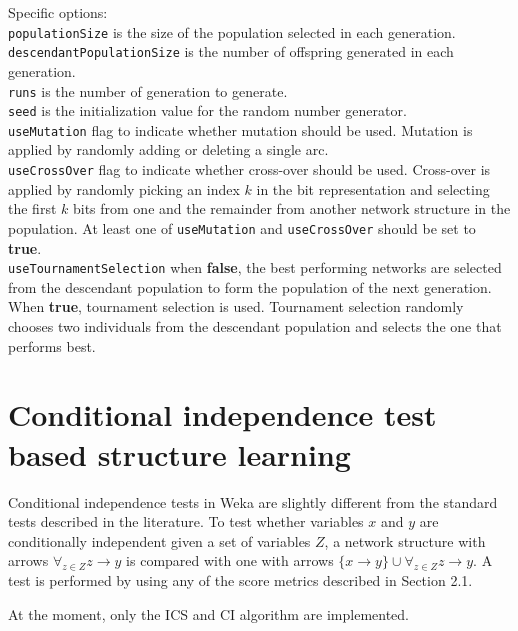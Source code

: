 \documentclass[a4paper]{article}
\begin{document}
\begin{itemize}
Specific options:\\
{\tt populationSize} is the size of the population selected in each generation.\\
{\tt descendantPopulationSize} is the number of offspring generated in each generation.\\
{\tt runs} is the number of generation to generate.\\
{\tt seed} is the initialization value for the random number generator.\\
{\tt useMutation} flag to indicate whether mutation should be used. Mutation is applied by
randomly adding or deleting a single arc.\\
{\tt useCrossOver} flag to indicate whether cross-over should be used. Cross-over is applied
by randomly picking an index $k$ in the bit representation and selecting the first $k$ bits
from one and the remainder from another network structure in the population.
At least one of \texttt{useMutation} and \texttt{useCrossOver} should be set to \textbf{true}.\\
{\tt useTournamentSelection} when \textbf{false}, the best performing networks are selected from
the descendant population to form the population of the next generation. 
When \textbf{true}, tournament selection is used. Tournament selection randomly chooses two
individuals from the descendant population and selects the one that performs best.\\
\end{itemize}

\section{Conditional independence test based structure learning}

Conditional independence tests in Weka are slightly different from the
standard tests described in the literature. To test whether variables
$x$ and $y$ are conditionally independent given a set of variables $Z$,
a network structure with arrows $\forall_{z\in Z}z \to y$ is compared with
one with arrows $\{x\to y\} \cup \forall_{z\in Z}z \to y$. 
A test is performed by using any of the score metrics described in Section 
2.1.

\begin{center}
\end{center}

At the moment, only the ICS  \cite{verma}and CI algorithm are implemented. 
\end{document}
